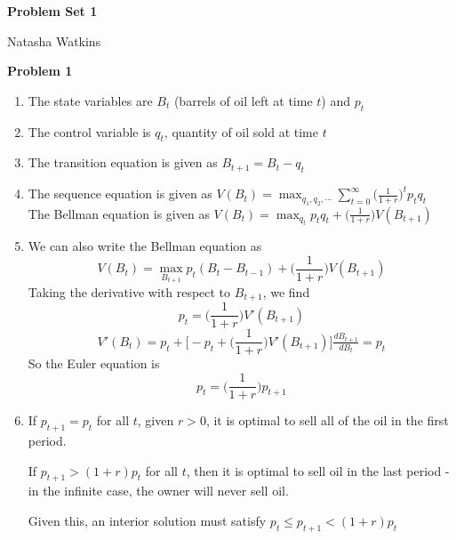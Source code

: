 \documentclass[letterpaper,12pt]{article}
\begin{document}
\textbf{\large Problem Set 1}

Natasha Watkins

\vspace{5mm}

\textbf{Problem 1}

\begin{enumerate}
  \item The state variables are $B_t$ (barrels of oil left at time $t$) and $p_t$
  \item The control variable is $q_t$, quantity of oil sold at time $t$
  \item The transition equation is given as $B_{t+1} = B_t - q_t$
  \item The sequence equation is given as $V(B_t) = \max_{q_1, q_2,       \cdots} \sum_{t=0}^\infty \Big( \frac{1}{1+r} \Big)^t p_t q_t$ \\ The Bellman equation is given as $V(B_t) = \max_{q_t} p_t q_t + \Big( \frac{1}{1+r} \Big) V(B_{t+1}) $
  \item We can also write the Bellman equation as 
        $$
        V(B_t) = \max_{B_{t+1}} p_t (B_t - B_{t-1}) + \Big( \frac{1}{1+r} \Big) V(B_{t+1})
        $$
        Taking the derivative with respect to $B_{t+1}$, we find
        $$
        p_t = \Big( \frac{1}{1+r} \Big)V'(B_{t+1})
        $$
        $$
        V'(B_t) = p_t + \Big[-p_t + \Big( \frac{1}{1+r} \Big) V'(B_{t+1}) \Big] \tfrac{dB_{t+1}}{dB_t} = p_t
        $$
        So the Euler equation is
        $$
        p_t = \Big( \frac{1}{1+r} \Big)p_{t+1}
        $$
  \item If $p_{t+1} = p_t$ for all $t$, given $r > 0$, it is optimal   to sell all of the oil in the first period. 
        
        If $p_{t+1} > (1 + r)p_t$ for all $t$, then it is optimal to sell oil in the last period - in the infinite case, the owner will never sell oil.
        
        Given this, an interior solution must satisfy $p_t \leq p_{t+1} <
        (1+r) p_t$
        
        
\end{enumerate}
\end{document}
